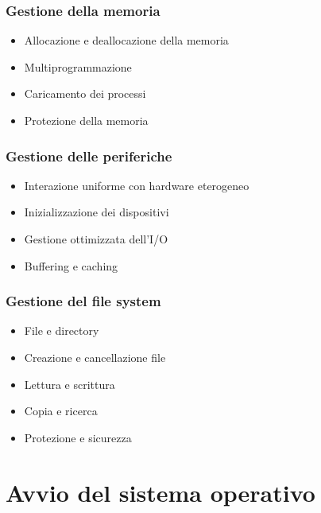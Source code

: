 \documentclass{beamer}
\begin{document}
	
	\begin{frame}
		\frametitle{Gestione della memoria}
		
		\begin{itemize}
			\item Allocazione e deallocazione della memoria
			\item Multiprogrammazione
			\item Caricamento dei processi
			\item Protezione della memoria
		\end{itemize}
		
	\end{frame}
	
	
	\begin{frame}
		\frametitle{Gestione delle periferiche}
		
		\begin{itemize}
			\item Interazione uniforme con hardware eterogeneo
			\item Inizializzazione dei dispositivi
			\item Gestione ottimizzata dell'I/O
			\item Buffering e caching
		\end{itemize}
		
	\end{frame}
	
	
	\begin{frame}
		\frametitle{Gestione del file system}
		
		\begin{itemize}
			\item File e directory
			\item Creazione e cancellazione file
			\item Lettura e scrittura
			\item Copia e ricerca
			\item Protezione e sicurezza
		\end{itemize}
		
	\end{frame}
	
	\section{Avvio del sistema operativo}
	
\end{document}
